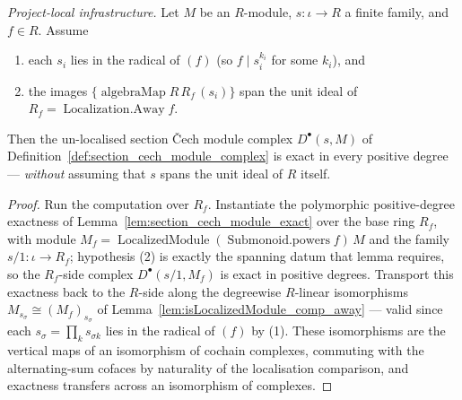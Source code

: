 \begin{lemma}\leanok
  \label{lem:section_cech_module_exact_of_localizationAway}
  \textit{Project-local infrastructure.}
  Let \(M\) be an \(R\)-module, \(s : \iota \to R\) a finite family, and \(f \in R\). Assume
  \begin{enumerate}
  \item each \(s_i\) lies in the radical of \((f)\) (so \(f \mid s_i^{k_i}\) for some \(k_i\)), and
  \item the images \(\{\operatorname{algebraMap} R\, R_f\, (s_i)\}\) span the unit ideal of
    \(R_f = \operatorname{Localization.Away} f\).
  \end{enumerate}
  Then the un-localised section {\v C}ech module complex \(D^\bullet(s, M)\) of
  Definition~\ref{def:section_cech_module_complex} is exact in every positive degree --- \emph{without}
  assuming that \(s\) spans the unit ideal of \(R\) itself.
\end{lemma}
\begin{proof}
  \leanok
  Run the computation over \(R_f\). Instantiate the polymorphic positive-degree exactness of
  Lemma~\ref{lem:section_cech_module_exact} over the base ring \(R_f\), with module
  \(M_f = \operatorname{LocalizedModule}(\operatorname{Submonoid.powers} f)\, M\) and the family
  \(s/1 : \iota \to R_f\); hypothesis (2) is exactly the spanning datum that lemma requires, so the
  \(R_f\)-side complex \(D^\bullet(s/1, M_f)\) is exact in positive degrees. Transport this exactness
  back to the \(R\)-side along the degreewise \(R\)-linear isomorphisms
  \(M_{s_\sigma} \cong (M_f)_{s_\sigma}\) of Lemma~\ref{lem:isLocalizedModule_comp_away} --- valid since
  each \(s_\sigma = \prod_k s_{\sigma k}\) lies in the radical of \((f)\) by (1). These isomorphisms are
  the vertical maps of an isomorphism of cochain complexes, commuting with the alternating-sum cofaces
  by naturality of the localisation comparison, and exactness transfers across an isomorphism of
  complexes.
\end{proof}

